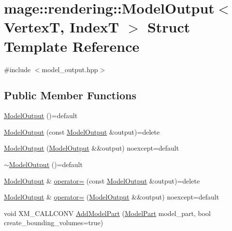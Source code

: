 \hypertarget{structmage_1_1rendering_1_1_model_output}{}\section{mage\+:\+:rendering\+:\+:Model\+Output$<$ VertexT, IndexT $>$ Struct Template Reference}
\label{structmage_1_1rendering_1_1_model_output}


{\ttfamily \#include $<$model\+\_\+output.\+hpp$>$}

\subsection*{Public Member Functions}
\begin{DoxyCompactItemize}
\item 
\mbox{\hyperlink{structmage_1_1rendering_1_1_model_output_a0aaa7f6abf4c5df03fe02b49ef189e3b}{Model\+Output}} ()=default
\item 
\mbox{\hyperlink{structmage_1_1rendering_1_1_model_output_a52280b5fe47b266e44bf65ea5dcd6752}{Model\+Output}} (const \mbox{\hyperlink{structmage_1_1rendering_1_1_model_output}{Model\+Output}} \&output)=delete
\item 
\mbox{\hyperlink{structmage_1_1rendering_1_1_model_output_a449de2164c45500f02bbe03f4bdc648f}{Model\+Output}} (\mbox{\hyperlink{structmage_1_1rendering_1_1_model_output}{Model\+Output}} \&\&output) noexcept=default
\item 
\mbox{\hyperlink{structmage_1_1rendering_1_1_model_output_a627e604ee86986e4d439244ff734c69c}{$\sim$\+Model\+Output}} ()=default
\item 
\mbox{\hyperlink{structmage_1_1rendering_1_1_model_output}{Model\+Output}} \& \mbox{\hyperlink{structmage_1_1rendering_1_1_model_output_a902ae401740dbcc886b85977efe7c0da}{operator=}} (const \mbox{\hyperlink{structmage_1_1rendering_1_1_model_output}{Model\+Output}} \&output)=delete
\item 
\mbox{\hyperlink{structmage_1_1rendering_1_1_model_output}{Model\+Output}} \& \mbox{\hyperlink{structmage_1_1rendering_1_1_model_output_a10eb65082a0104be36c51cfc613fd156}{operator=}} (\mbox{\hyperlink{structmage_1_1rendering_1_1_model_output}{Model\+Output}} \&\&output) noexcept=default
\item 
void X\+M\+\_\+\+C\+A\+L\+L\+C\+O\+NV \mbox{\hyperlink{structmage_1_1rendering_1_1_model_output_a33512b10fe669c18051a4eac3444f962}{Add\+Model\+Part}} (\mbox{\hyperlink{structmage_1_1rendering_1_1_model_part}{Model\+Part}} model\+\_\+part, bool create\+\_\+bounding\+\_\+volumes=true)

\end{DoxyCompactItemize}
